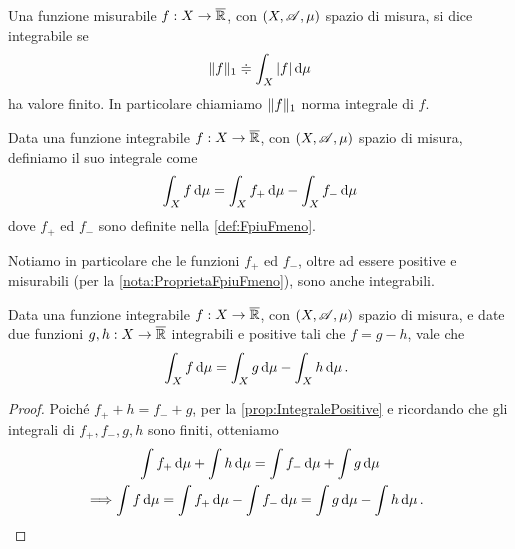 \begin{definition}
	Una funzione misurabile $f:X\to\overline{\mathbb R}$, con $(X,\mathscr A,\mu)$ spazio di misura, si dice integrabile se 
	\begin{equation*}
		\Vert f\Vert_1\doteqdot \int_X |f|\,\mathrm d\mu
	\end{equation*}
	ha valore finito. In particolare chiamiamo $\Vert f\Vert_1$ norma integrale di $f$.
	
\end{definition}

\begin{definition}\label{def:IntegraleIntegrabili}
	Data una funzione integrabile $f:X\to\overline{\mathbb R}$, con $(X,\mathscr A,\mu)$ spazio di misura, definiamo il suo integrale come
	\begin{equation*}
		\int_X f\,\mathrm d\mu=\int_Xf_+\,\mathrm d\mu-\int_Xf_-\,\mathrm d\mu
	\end{equation*}
	dove $f_+$ ed $f_-$ sono definite nella \cref{def:FpiuFmeno}.
\end{definition}

\begin{remark}\label{nota:FpiuFmenoIntegrabili}
	Notiamo in particolare che le funzioni $f_+$ ed $f_-$, oltre ad essere positive e misurabili (per la \cref{nota:ProprietaFpiuFmeno}), sono anche integrabili.
\end{remark}

\begin{lemma}\label{lemma:DefinizioneEquivalenteIntegraleIntegrabili}
	Data una funzione integrabile $f:X\to\overline{\mathbb R}$, con $(X,\mathscr A,\mu)$ spazio di misura, e date due funzioni $g,h:X\to \overline{\mathbb R}$ integrabili e positive tali che $f=g-h$, vale che
	\begin{equation*}
		\int_X f\,\mathrm d\mu=\int_Xg\,\mathrm d\mu-\int_Xh\,\mathrm d\mu\, \text{. }
	\end{equation*}
\end{lemma}
\begin{proof}
	Poiché $f_++h=f_-+g$, per la \cref{prop:IntegralePositive} e ricordando che gli integrali di $f_+,f_-,g,h$ sono finiti, otteniamo
	\begin{gather*}
		\int  f_+\,\mathrm d\mu+\int  h\,\mathrm d\mu=\int  f_-\,\mathrm d\mu+\int  g\,\mathrm d\mu \\
		\Longrightarrow \int f\,\mathrm d\mu=\int f_+\,\mathrm d\mu-\int f_-\,\mathrm d\mu=\int g\,\mathrm d\mu-\int h\,\mathrm d\mu\, \text{. }
	\end{gather*}
\end{proof}



